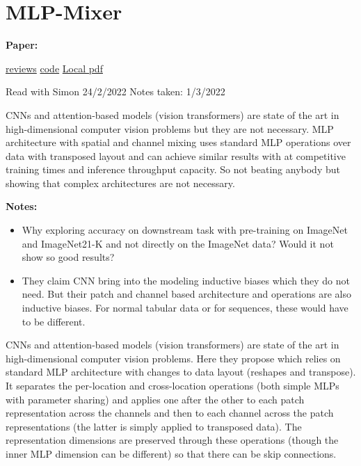 \clearpage

\section{MLP-Mixer}\label{sec:mlpmixer}

\begin{notebox}
\textbf{Paper: } 
\vspace{5pt}

\href{https://openreview.net/forum?id=EI2KOXKdnP}{reviews}
\hspace{1cm}
\href{https://github.com/lucidrains/mlp-mixer-pytorch}{code}
\hspace{1cm}
\href{run:/home/magda/Dropbox/Zot/Tolstikhin et al_2021_MLP-Mixer.pdf}{Local pdf}
\vspace{3pt}

Read with Simon 24/2/2022
\hfill Notes taken: 1/3/2022 
\end{notebox}

\begin{notebox}[colback=red!5]
\tldr CNNs and attention-based models (vision transformers) are state of the art in high-dimensional computer vision problems but they are not necessary. MLP architecture with spatial and channel mixing uses standard MLP operations over data with transposed layout and can achieve similar results with at competitive training times and inference throughput capacity. So not beating anybody but showing that complex architectures are not necessary.
\end{notebox}

\begin{notebox}[colback=yellow!5]
\textbf{Notes:} 
\begin{itemize}[nosep]
\item Why exploring accuracy on downstream task with pre-training on ImageNet and ImageNet21-K and not directly on the ImageNet data? Would it not show so good results?
\item They claim CNN bring into the modeling inductive biases which they do not need. But their patch and channel based architecture and operations are also inductive biases. For normal tabular data or for sequences, these would have to be different.
\end{itemize}
\end{notebox}

CNNs and attention-based models (vision transformers) are state of the art in high-dimensional computer vision problems. Here they propose  which relies on standard MLP architecture with changes to data layout (reshapes and transpose).
It separates the per-location  and cross-location  operations (both simple MLPs with parameter sharing) and applies one after the other to each patch representation across the channels and then to each channel across the patch representations (the latter is simply applied to transposed data). The representation dimensions are preserved through these operations (though the inner MLP dimension can be different) so that there can be skip connections.

